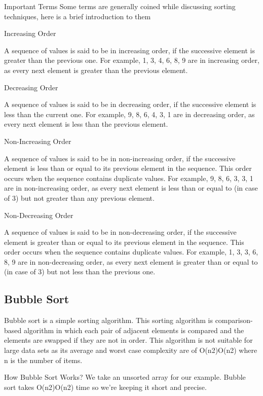 Important Terms
Some terms are generally coined while discussing sorting techniques, here is a brief introduction to them

Increasing Order

A sequence of values is said to be in increasing order, if the successive element is greater than the previous one. For example, 1, 3, 4, 6, 8, 9 are in increasing order, as every next element is greater than the previous element.

Decreasing Order

A sequence of values is said to be in decreasing order, if the successive element is less than the current one. For example, 9, 8, 6, 4, 3, 1 are in decreasing order, as every next element is less than the previous element.

Non-Increasing Order

A sequence of values is said to be in non-increasing order, if the successive element is less than or equal to its previous element in the sequence. This order occurs when the sequence contains duplicate values. For example, 9, 8, 6, 3, 3, 1 are in non-increasing order, as every next element is less than or equal to (in case of 3) but not greater than any previous element.

Non-Decreasing Order

A sequence of values is said to be in non-decreasing order, if the successive element is greater than or equal to its previous element in the sequence. This order occurs when the sequence contains duplicate values. For example, 1, 3, 3, 6, 8, 9 are in non-decreasing order, as every next element is greater than or equal to (in case of 3) but not less than the previous one.

\subsection{Bubble Sort}

Bubble sort is a simple sorting algorithm. This sorting algorithm is comparison-based algorithm in which each pair of adjacent elements is compared and the elements are swapped if they are not in order. This algorithm is not suitable for large data sets as its average and worst case complexity are of O(n2)Ο(n2) where n is the number of items.

How Bubble Sort Works?
We take an unsorted array for our example. Bubble sort takes O(n2)Ο(n2) time so we're keeping it short and precise.



